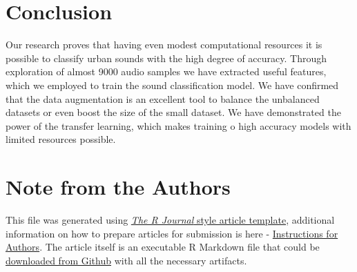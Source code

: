 \hypertarget{conclusion}{%
\section{Conclusion}\label{conclusion}}

Our research proves that having even modest computational resources it
is possible to classify urban sounds with the high degree of accuracy.
Through exploration of almost 9000 audio samples we have extracted
useful features, which we employed to train the sound classification
model. We have confirmed that the data augmentation is an excellent tool
to balance the unbalanced datasets or even boost the size of the small
dataset. We have demonstrated the power of the transfer learning, which
makes training o high accuracy models with limited resources possible.



\hypertarget{note-from-the-authors}{%
\section{Note from the Authors}\label{note-from-the-authors}}

This file was generated using
\href{https://github.com/rstudio/rticles}{\emph{The R Journal} style
article template}, additional information on how to prepare articles for
submission is here -
\href{https://journal.r-project.org/share/author-guide.pdf}{Instructions
for Authors}. The article itself is an executable R Markdown file that
could be
\href{https://github.com/ivbsoftware/big-data-final-2/blob/master/docs/R_Journal/big-data-final-2/}{downloaded
from Github} with all the necessary artifacts.


\address{%
Vadim Spirkov\\
York University School of Continuing Studies\\
\\
}


\address{%
Murlidhar Loka\\
York University School of Continuing Studies\\
\\
}


